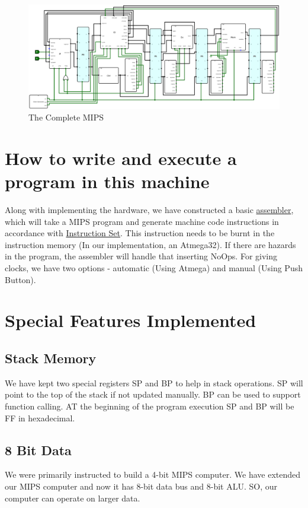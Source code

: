 \documentclass[12pt]{article}
\begin{document}
 \begin{figure}[H]
     \centering
     \includegraphics[width=\textwidth]{Images/MIPS.png}
     \caption{The Complete MIPS}
     \label{fig:mips}
 \end{figure}

\newpage
\section{\large{How to write and execute a program in this machine}}
\label{prog}
Along with implementing the hardware, we have constructed a basic \href{https://github.com/risenfromashes/cse306/tree/ashraf/MIPS/Assembler}{assembler}, which will take a MIPS program and generate machine code instructions in accordance with \hyperref[IS]{Instruction Set}. This instruction needs to be burnt in the instruction memory (In our implementation, an Atmega32). If there are hazards in the program, the assembler will handle that inserting NoOps. For giving clocks, we have two options - automatic (Using Atmega) and manual (Using Push Button).

\newpage
\section{\large{Special Features Implemented}}
\label{Spec}
\subsection{Stack Memory}
We have kept two special registers SP and BP to help in stack operations. SP will point to the top of the stack if not updated manually. BP can be used to support function calling. AT the beginning of the program execution SP and BP will be FF in hexadecimal.
\subsection{8 Bit Data}
We were primarily instructed to build a 4-bit MIPS computer. We have extended our MIPS computer and now it has 8-bit data bus and 8-bit ALU. SO, our computer can operate on larger data.
\end{document}
